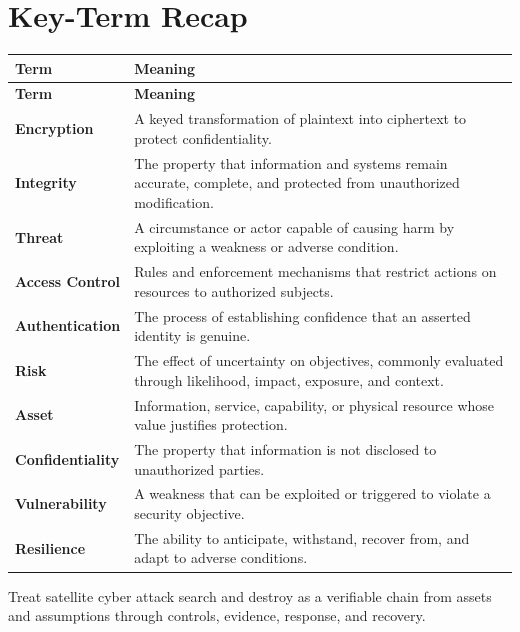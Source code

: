 \documentclass[11pt]{article}
\begin{document}
\section*{Key-Term Recap}
\begin{longtable}{>{\RaggedRight\arraybackslash}p{}>{\RaggedRight\arraybackslash}p{}}
\toprule\rowcolor{Navy}\color{white}\textbf{Term} & \color{white}\textbf{Meaning}\\\midrule
\endfirsthead
\toprule\rowcolor{Navy}\color{white}\textbf{Term} & \color{white}\textbf{Meaning}\\\midrule
\endhead
\textbf{Encryption} & A keyed transformation of plaintext into ciphertext to protect confidentiality. \\\midrule
\textbf{Integrity} & The property that information and systems remain accurate, complete, and protected from unauthorized modification. \\\midrule
\textbf{Threat} & A circumstance or actor capable of causing harm by exploiting a weakness or adverse condition. \\\midrule
\textbf{Access Control} & Rules and enforcement mechanisms that restrict actions on resources to authorized subjects. \\\midrule
\textbf{Authentication} & The process of establishing confidence that an asserted identity is genuine. \\\midrule
\textbf{Risk} & The effect of uncertainty on objectives, commonly evaluated through likelihood, impact, exposure, and context. \\\midrule
\textbf{Asset} & Information, service, capability, or physical resource whose value justifies protection. \\\midrule
\textbf{Confidentiality} & The property that information is not disclosed to unauthorized parties. \\\midrule
\textbf{Vulnerability} & A weakness that can be exploited or triggered to violate a security objective. \\\midrule
\textbf{Resilience} & The ability to anticipate, withstand, recover from, and adapt to adverse conditions. \\\midrule
\bottomrule
\end{longtable}
\begin{takeawaybox}
Treat satellite cyber attack search and destroy as a verifiable chain from assets and assumptions through controls, evidence, response, and recovery.
\end{takeawaybox}
\end{document}
